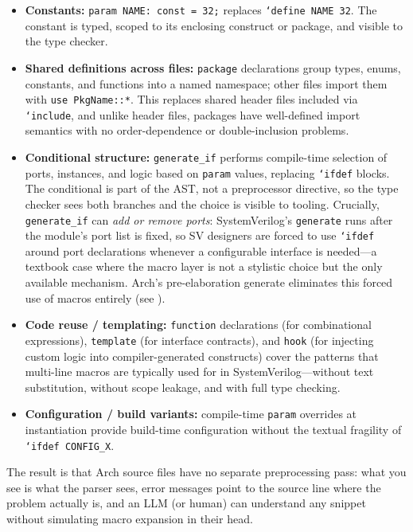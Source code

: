 \documentclass[11pt,twocolumn]{article}
\begin{document}
\begin{itemize}
\item \textbf{Constants:} \texttt{param NAME: const = 32;} replaces \texttt{`define NAME 32}. The constant is typed, scoped to its enclosing construct or package, and visible to the type checker.
\item \textbf{Shared definitions across files:} \texttt{package} declarations group types, enums, constants, and functions into a named namespace; other files import them with \texttt{use PkgName::*}. This replaces shared header files included via \texttt{`include}, and unlike header files, packages have well-defined import semantics with no order-dependence or double-inclusion problems.
\item \textbf{Conditional structure:} \texttt{generate\_if} performs compile-time selection of ports, instances, and logic based on \texttt{param} values, replacing \texttt{`ifdef} blocks. The conditional is part of the AST, not a preprocessor directive, so the type checker sees both branches and the choice is visible to tooling. Crucially, \texttt{generate\_if} can \emph{add or remove ports}: SystemVerilog's \texttt{generate} runs after the module's port list is fixed, so SV designers are forced to use \texttt{`ifdef} around port declarations whenever a configurable interface is needed---a textbook case where the macro layer is not a stylistic choice but the only available mechanism. Arch's pre-elaboration generate eliminates this forced use of macros entirely (see ).
\item \textbf{Code reuse / templating:} \texttt{function} declarations (for combinational expressions), \texttt{template} (for interface contracts), and \texttt{hook} (for injecting custom logic into compiler-generated constructs) cover the patterns that multi-line macros are typically used for in SystemVerilog---without text substitution, without scope leakage, and with full type checking.
\item \textbf{Configuration / build variants:} compile-time \texttt{param} overrides at instantiation provide build-time configuration without the textual fragility of \texttt{`ifdef CONFIG\_X}.
\end{itemize}

The result is that Arch source files have no separate preprocessing pass: what you see is what the parser sees, error messages point to the source line where the problem actually is, and an LLM (or human) can understand any snippet without simulating macro expansion in their head.
\end{document}
